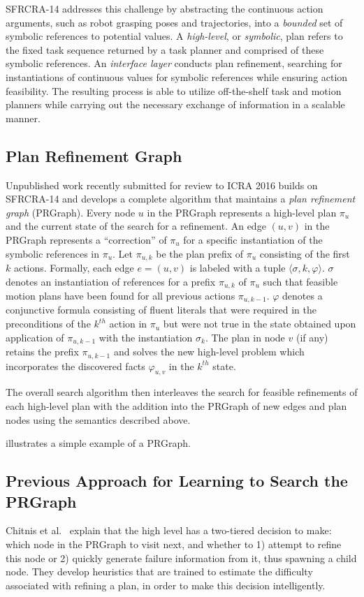 SFRCRA-14 addresses this challenge by abstracting the continuous
action arguments, such as robot grasping poses and trajectories, into
a \emph{bounded} set of symbolic references to potential values. A
\emph{high-level}, or \emph{symbolic}, plan refers to the fixed task
sequence returned by a task planner and comprised of these symbolic
references. An \emph{interface layer} conducts plan refinement,
searching for instantiations of continuous values for symbolic
references while ensuring action feasibility.  The resulting process
is able to utilize off-the-shelf task and motion planners while
carrying out the necessary exchange of information in a scalable
manner.

\subsection{Plan Refinement Graph}
Unpublished work recently submitted for review to ICRA 2016 builds on SFRCRA-14 and develops a complete algorithm
that maintains a \emph{plan refinement graph} (PRGraph). Every node $u$ in the PRGraph
represents a high-level plan $\pi_u$ and the current state of the search
for a refinement. An edge $(u,v)$ in the PRGraph
represents a ``correction'' of $\pi_u$ for a specific instantiation of
the symbolic references in $\pi_u$. Let $\pi_{u,k}$ be the plan prefix of
$\pi_u$ consisting of the first $k$ actions. Formally, each edge
$e=(u,v)$ is labeled with a tuple $\langle \sigma, k, \varphi \rangle$.
$\sigma$ denotes an instantiation of references for a prefix $\pi_{u,k}$ of
$\pi_u$ such that feasible motion plans have been found for all
previous actions $\pi_{u,k-1}$. $\varphi$ denotes a conjunctive formula
consisting of fluent literals
that were required in the preconditions of the $k^{th}$ action in
$\pi_u$ but were not true in the state obtained upon
application of $\pi_{u,k-1}$ with the instantiation $\sigma_k$.  The
plan in node $v$ (if any) retains the prefix $\pi_{u,k-1}$ and solves
the new high-level problem which incorporates the discovered facts $\varphi_{u,v}$
in the $k^{th}$ state.

The overall search algorithm then interleaves the search for feasible
refinements of each high-level plan with the addition into the
PRGraph of new edges and plan nodes using the semantics described above.

 illustrates a simple example of a PRGraph.

\subsection{Previous Approach for Learning to Search the PRGraph}
Chitnis et al.~\cite{chitnis2015mlpc} explain that the high level has a two-tiered
decision to make: which node in the PRGraph to
visit next, and whether to 1) attempt to refine this node or 2) quickly generate failure information
from it, thus spawning a child node. They develop heuristics that are trained to estimate
the difficulty associated with refining a plan, in order to make this decision intelligently.

